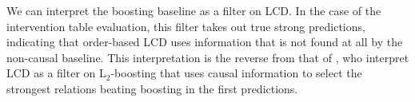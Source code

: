 We can interpret the boosting baseline as a filter on LCD. In the case of the intervention table evaluation, this filter takes out true strong predictions, indicating that order-based LCD uses information that is not found at all by the non-causal baseline. This interpretation is the reverse from that of \citet{versteeg2019boosting}, who interpret LCD as a filter on L$_2$-boosting that uses causal information to select the strongest relations beating boosting in the first predictions. 
















